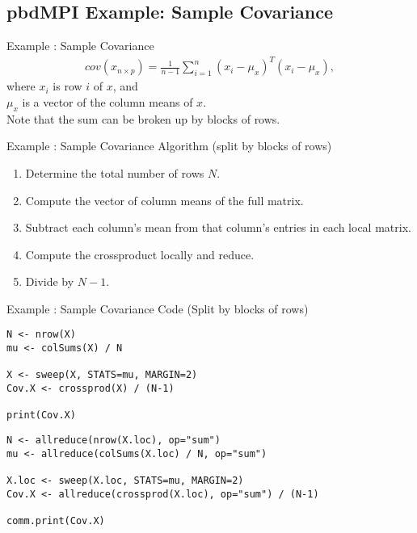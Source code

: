 \subsection{pbdMPI Example: Sample Covariance}
\makesubcontentsslidessec


\begin{frame}
  \begin{block}{Example \countex :  Sample Covariance}\pause
  \begin{align*}
    cov(x_{n\times p}) = \frac{1}{n-1}\sum_{i=1}^n\left(x_i-\mu_x\right)^T\left(x_i-\mu_x\right),
  \end{align*}
  where $x_i$ is row $i$ of $x$, and \\ $\mu_x$ is a vector of the column 
  means of $x$. \\[1em]
  Note that the sum can be broken up by blocks of rows.
  \end{block}
\end{frame}


\begin{frame}
  \begin{block}{Example \showex :  Sample Covariance Algorithm (split by blocks of rows)}\pause
    \begin{enumerate}
     \item Determine the total number of rows $N$.
     \item Compute the vector of column means of the full matrix.
     \item Subtract each column's mean from that column's entries in each local matrix.
     \item Compute the crossproduct locally and reduce.
     \item Divide by $N-1$.
    \end{enumerate}
  \end{block}
\end{frame}


\begin{frame}[fragile]
  \begin{exampleblock}{Example \showex :  Sample Covariance Code
      (Split by blocks of rows)}\pause
\begin{lstlisting}[title=Serial Code]
N <- nrow(X)
mu <- colSums(X) / N

X <- sweep(X, STATS=mu, MARGIN=2)
Cov.X <- crossprod(X) / (N-1)

print(Cov.X)
\end{lstlisting}
  
\begin{lstlisting}[title=Parallel Code]
N <- allreduce(nrow(X.loc), op="sum")
mu <- allreduce(colSums(X.loc) / N, op="sum")

X.loc <- sweep(X.loc, STATS=mu, MARGIN=2)
Cov.X <- allreduce(crossprod(X.loc), op="sum") / (N-1)

comm.print(Cov.X)
\end{lstlisting}
  \end{exampleblock}
\end{frame}

